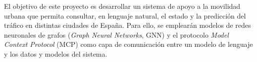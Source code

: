 
El objetivo de este proyecto es desarrollar un sistema de apoyo a la movilidad urbana que permita consultar, en lenguaje natural, el estado y la predicción del tráfico en distintas ciudades de España. Para ello, se emplearán modelos de redes neuronales de grafos (\textit{Graph Neural Networks}, GNN) y el protocolo \textit{Model Context Protocol} (MCP) como capa de comunicación entre un modelo de lenguaje y los datos y modelos del sistema.
